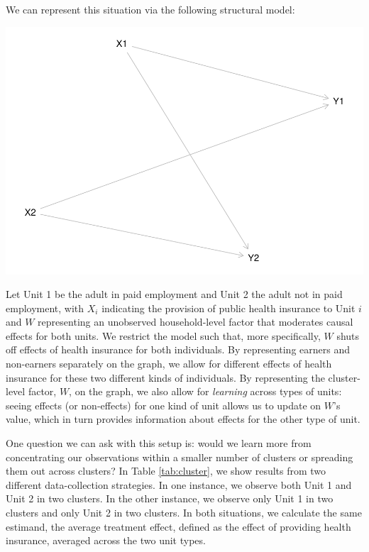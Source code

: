 \documentclass[
  12pt,
]{book}
\begin{document}
We can represent this situation via the following structural model:

\includegraphics{ii_files/figure-latex/unnamed-chunk-23-1.pdf}

Let Unit 1 be the adult in paid employment and Unit 2 the adult not in paid employment, with \(X_i\) indicating the provision of public health insurance to Unit \(i\) and \(W\) representing an unobserved household-level factor that moderates causal effects for both units. We restrict the model such that, more specifically, \(W\) shuts off effects of health insurance for both individuals. By representing earners and non-earners separately on the graph, we allow for different effects of health insurance for these two different kinds of individuals. By representing the cluster-level factor, \(W\), on the graph, we also allow for \emph{learning} across types of units: seeing effects (or non-effects) for one kind of unit allows us to update on \(W\)'s value, which in turn provides information about effects for the other type of unit.

One question we can ask with this setup is: would we learn more from concentrating our observations within a smaller number of clusters or spreading them out across clusters? In Table \ref{tab:cluster}, we show results from two different data-collection strategies. In one instance, we observe both Unit 1 and Unit 2 in two clusters. In the other instance, we observe only Unit 1 in two clusters and only Unit 2 in two clusters.
In both situations, we calculate the same estimand, the average treatment effect, defined as the effect of providing health insurance, averaged across the two unit types.
\end{document}

